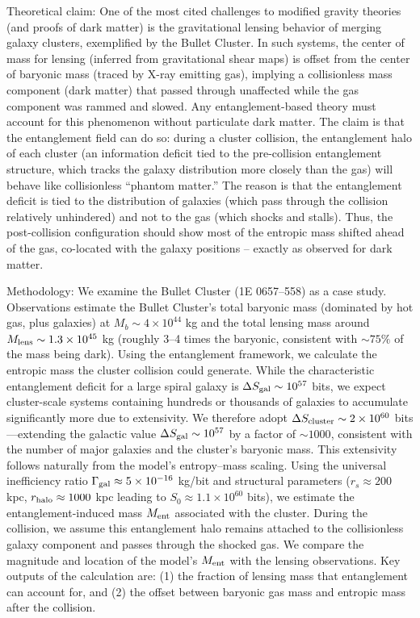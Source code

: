 \documentclass[11pt]{article}
\begin{document}
Theoretical claim: One of the most cited challenges to modified gravity theories (and proofs of dark matter) is the gravitational lensing behavior of merging galaxy clusters, exemplified by the Bullet Cluster. In such systems, the center of mass for lensing (inferred from gravitational shear maps) is offset from the center of baryonic mass (traced by X-ray emitting gas), implying a collisionless mass component (dark matter) that passed through unaffected while the gas component was rammed and slowed. Any entanglement-based theory must account for this phenomenon without particulate dark matter. The claim is that the entanglement field can do so: during a cluster collision, the entanglement halo of each cluster (an information deficit tied to the pre-collision entanglement structure, which tracks the galaxy distribution more closely than the gas) will behave like collisionless “phantom matter.” The reason is that the entanglement deficit is tied to the distribution of galaxies (which pass through the collision relatively unhindered) and not to the gas (which shocks and stalls). Thus, the post-collision configuration should show most of the entropic mass shifted ahead of the gas, co-located with the galaxy positions – exactly as observed for dark matter.

Methodology: We examine the Bullet Cluster (1E 0657–558) as a case study. Observations estimate the Bullet Cluster’s total baryonic mass (dominated by hot gas, plus galaxies) at $M_b \sim 4\times10^{44}$ kg and the total lensing mass around $M_{\rm lens}\sim 1.3\times10^{45}$ kg (roughly 3–4 times the baryonic, consistent with $\sim 75\%$ of the mass being dark). Using the entanglement framework, we calculate the entropic mass the cluster collision could generate. While the characteristic entanglement deficit for a large spiral galaxy is $\Delta S_{\rm gal} \sim 10^{57}$ bits, we expect cluster-scale systems containing hundreds or thousands of galaxies to accumulate significantly more due to extensivity. We therefore adopt $\Delta S_{\rm cluster} \sim 2 \times 10^{60}$ bits—extending the galactic value $\Delta S_{\rm gal} \sim 10^{57}$ by a factor of $\sim 1000$, consistent with the number of major galaxies and the cluster’s baryonic mass. This extensivity follows naturally from the model’s entropy–mass scaling. Using the universal inefficiency ratio $\Gamma_{\rm gal} \approx 5 \times 10^{-16}$ kg/bit and structural parameters ($r_s \approx 200$ kpc, $r_{\rm halo} \approx 1000$ kpc leading to $S_0 \approx 1.1 \times 10^{60}$ bits), we estimate the entanglement-induced mass $M_{\rm ent}$ associated with the cluster. During the collision, we assume this entanglement halo remains attached to the collisionless galaxy component and passes through the shocked gas. We compare the magnitude and location of the model’s $M_{\rm ent}$ with the lensing observations. Key outputs of the calculation are: (1) the fraction of lensing mass that entanglement can account for, and (2) the offset between baryonic gas mass and entropic mass after the collision.
\end{document}
